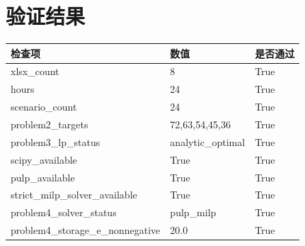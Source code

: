 \documentclass[bwprint]{gmcmthesis}
\numberwithin{figure}{section}
\numberwithin{table}{section}
\begin{document}
\section{验证结果}
\begin{longtable}{lll}
\toprule
检查项 & 数值 & 是否通过 \\
\midrule
xlsx\_count & 8 & True \\
hours & 24 & True \\
scenario\_count & 24 & True \\
problem2\_targets & 72,63,54,45,36 & True \\
problem3\_lp\_status & analytic\_optimal & True \\
scipy\_available & True & True \\
pulp\_available & True & True \\
strict\_milp\_solver\_available & True & True \\
problem4\_solver\_status & pulp\_milp & True \\
problem4\_storage\_e\_nonnegative & 20.0 & True \\
\bottomrule
\end{longtable}
\end{document}
